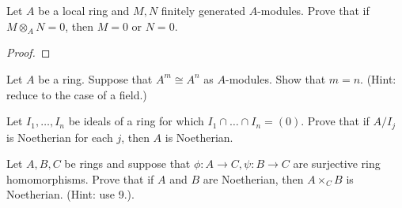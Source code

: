 \documentclass{article}
\begin{document}
 Let $A$ be a local ring and $M,N$ finitely generated $A$-modules. Prove that if $M \otimes_A  N = 0$, then $M = 0$ or $N = 0$.

\begin{proof}


\end{proof}

 Let $A$ be a ring. Suppose that $A^m \cong A^n$ as $A$-modules.  Show that $m = n$. (Hint: reduce to the case of a field.)

 Let $I_1, \ldots, I_n$ be ideals of a ring for which $I_1 \cap \ldots \cap I_n = (0)$. Prove that if $A/I_j$ is Noetherian for each $j$, then $A$ is Noetherian.

 Let $A, B, C$ be rings and suppose that $\phi: A \to C, \psi: B \to C$ are surjective ring homomorphisms. Prove that if $A$ and $B$ are Noetherian, then $A \times_C B$ is Noetherian. (Hint: use 9.).
\end{document}
